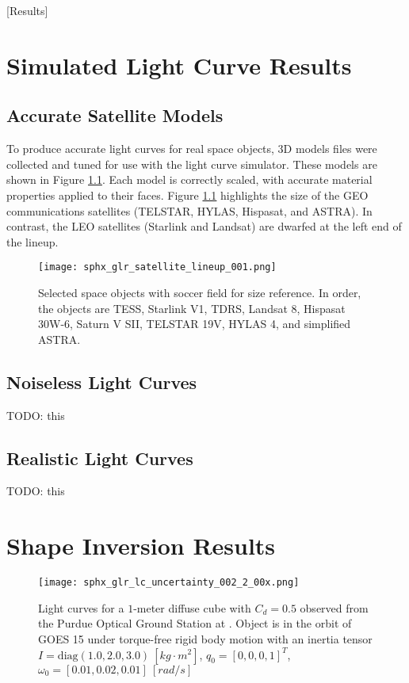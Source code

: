 [Results]
\graphicspath{{/Users/liamrobinson/Documents/PyLightCurves/docs/build/html/_images}}

\chapter{Simulated Light Curve Results}

\section{Accurate Satellite Models}

To produce accurate light curves for real space objects, 3D models files were collected and tuned for use with the light curve simulator. These models are shown in Figure \ref{fig:satellite_lineup}. Each model is correctly scaled, with accurate material properties applied to their faces. Figure \ref{fig:satellite_lineup} highlights the size of the GEO communications satellites (TELSTAR, HYLAS, Hispasat, and ASTRA). In contrast, the LEO satellites (Starlink and Landsat) are dwarfed at the left end of the lineup.

\begin{figure}[ht]
    \centering
    \texttt{[image: sphx\_glr\_satellite\_lineup\_001.png]}
    \caption{Selected space objects with soccer field for size reference. In order, the objects are TESS, Starlink V1, TDRS, Landsat 8, Hispasat 30W-6, Saturn V SII, TELSTAR 19V, HYLAS 4, and simplified ASTRA.
    }
    \label{fig:satellite_lineup}
\end{figure}

\section{Noiseless Light Curves}

TODO: this

\section{Realistic Light Curves}

TODO: this

\chapter{Shape Inversion Results}

\begin{figure}[!htb]
  \centering
  \texttt{[image: sphx\_glr\_lc\_uncertainty\_002\_2\_00x.png]}
  \caption{Light curves for a $1$-meter diffuse cube with $C_d = 0.5$ observed from the Purdue Optical Ground Station at \pogslla. Object is in the orbit of GOES 15 under torque-free rigid body motion with an inertia tensor $I = \mathrm{diag}(1.0, 2.0, 3.0) \: \left[kg \cdot m^2\right]$, $q_0 = \left[0, 0, 0, 1\right]^T$, $\omega_0 = \left[ 0.01, 0.02, 0.01 \right] \: \left[rad/s\right]$}
  \label{fig:cube_lcs}
\end{figure}

